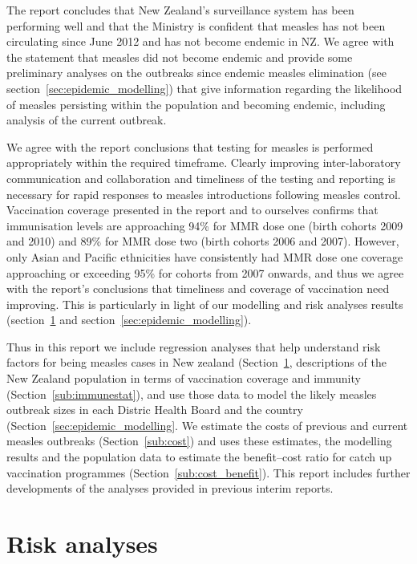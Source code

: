 \documentclass{article}
\begin{document}
The report concludes that New Zealand's surveillance system has been performing well and that the Ministry is confident that measles has not been circulating since June 2012 and has not become endemic in NZ. We agree with the statement that measles did not become endemic and provide some preliminary analyses on the outbreaks since endemic measles elimination (see section~\ref{sec:epidemic_modelling}) that give information regarding the likelihood of measles persisting within the population and becoming endemic, including analysis of the current outbreak.

We agree with the report conclusions that testing for measles is performed appropriately within the required timeframe. Clearly improving inter-laboratory communication and collaboration and timeliness of the testing and reporting is necessary for rapid responses to measles introductions following measles control. Vaccination coverage presented in the report and to ourselves confirms that immunisation levels are approaching 94\% for MMR dose one (birth cohorts 2009 and 2010) and 89\% for MMR dose two (birth cohorts 2006 and 2007). However, only Asian and Pacific ethnicities have consistently had MMR dose one coverage approaching or exceeding 95\% for cohorts from 2007 onwards, and thus we agree with the report's conclusions that timeliness and coverage of vaccination need improving. This is particularly in light of our modelling and risk analyses results (section~\ref{sub:risk_analyses} and section~\ref{sec:epidemic_modelling}).

Thus in this report we include regression analyses that help understand risk factors for being measles cases in New zealand (Section~\ref{sub:risk_analyses}, descriptions of the New Zealand population in terms of vaccination coverage and immunity (Section~\ref{sub:immunestat}), and use those data to model the likely measles outbreak sizes in each Distric Health Board and the country (Section~\ref{sec:epidemic_modelling}. We estimate the costs of previous and current measles outbreaks (Section~\ref{sub:cost}) and uses these estimates, the modelling results and the population data to estimate the benefit--cost ratio for catch up vaccination programmes (Section~\ref{sub:cost_benefit}). This report includes further developments of the analyses provided in previous interim reports.

\section{Risk analyses}
\label{sub:risk_analyses}
\end{document}
